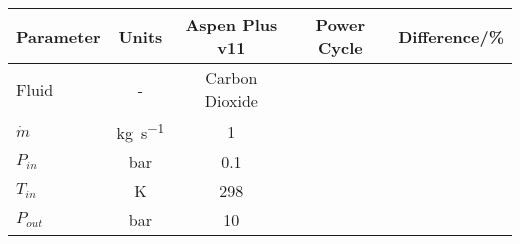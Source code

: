 \begin{tabular}{|p{2.5cm} c c c c|}
    \hline
    \rowcolor{bluepoli!40} %
    \textbf{Parameter} & \textbf{Units} & \textbf{Aspen Plus v11} & \textbf{Power Cycle} & \textbf{Difference/\unit{\percent}} \T\B \\
    \hline \hline
    Fluid  & - & Carbon Dioxide \T\B\\
    \(\Dot{m}\)  & \unit{\kg\per\s} & \num{1} \T\B\\
    \(P_{in}\) & \unit{\bar} & \num{0.1} \T\B\\
    \(T_{in}\) & \unit{\K} & \num{298} \T\B\\
    \(P_{out}\) & \unit{\bar} & \num{10} \T\B\\
    \hline
\end{tabular}